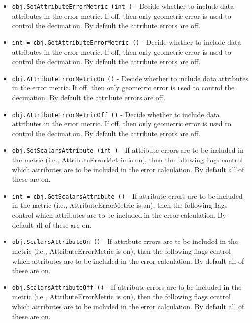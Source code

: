 \begin{itemize}
\item  \verb|obj.SetAttributeErrorMetric (int )| -  Decide whether to include data attributes in the error metric. If off,
 then only geometric error is used to control the decimation. By default
 the attribute errors are off.

\item  \verb|int = obj.GetAttributeErrorMetric ()| -  Decide whether to include data attributes in the error metric. If off,
 then only geometric error is used to control the decimation. By default
 the attribute errors are off.

\item  \verb|obj.AttributeErrorMetricOn ()| -  Decide whether to include data attributes in the error metric. If off,
 then only geometric error is used to control the decimation. By default
 the attribute errors are off.

\item  \verb|obj.AttributeErrorMetricOff ()| -  Decide whether to include data attributes in the error metric. If off,
 then only geometric error is used to control the decimation. By default
 the attribute errors are off.

\item  \verb|obj.SetScalarsAttribute (int )| -  If attribute errors are to be included in the metric (i.e.,
 AttributeErrorMetric is on), then the following flags control which
 attributes are to be included in the error calculation. By default all
 of these are on.

\item  \verb|int = obj.GetScalarsAttribute ()| -  If attribute errors are to be included in the metric (i.e.,
 AttributeErrorMetric is on), then the following flags control which
 attributes are to be included in the error calculation. By default all
 of these are on.

\item  \verb|obj.ScalarsAttributeOn ()| -  If attribute errors are to be included in the metric (i.e.,
 AttributeErrorMetric is on), then the following flags control which
 attributes are to be included in the error calculation. By default all
 of these are on.

\item  \verb|obj.ScalarsAttributeOff ()| -  If attribute errors are to be included in the metric (i.e.,
 AttributeErrorMetric is on), then the following flags control which
 attributes are to be included in the error calculation. By default all
 of these are on.


\end{itemize}
